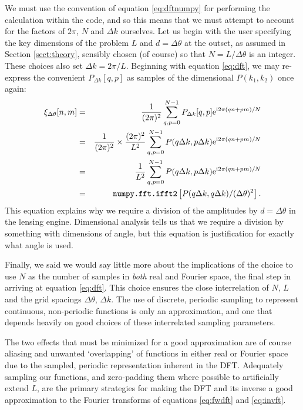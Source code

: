 \documentclass[preprint]{aastex}
\newcommand{\mi}{{\rm i}}
\newcommand{\me}{{\rm e}}
\begin{document}
We must use the convention of equation \eqref{eq:dftnumpy} for
performing the calculation within the code, and so this means that we
must attempt to account for the factors of $2 \pi$, $N$ and $\Delta
k$ ourselves.  Let us begin with the user specifying the
key dimensions of the problem $L$ and $d = \Delta \theta$ at the
outset, as assumed in Section \ref{sect:theory}, sensibly chosen (of
course) so that $N=L/\Delta \theta$ is an integer.  These choices also
set $\Delta k = 2 \pi / L$.  Beginning with equation
\eqref{eq:dft}, we may re-express the convenient $P_{\Delta k}[q, p]$ as
samples of the dimensional $P(k_1, k_2)$ once again:
\begin{eqnarray}
\xi_{\Delta \theta}[n, m] & = & \frac{1}{( 2 \pi)^2}
\sum_{q,p=0}^{N-1} P_{\Delta k} [q, p] \me^{\mi 2 \pi (qn +
  pm) / N}  \\ & = & \frac{1}{(2 \pi)^2} \times \frac{(2 \pi)^2}{L^2}
 \sum_{q,p=0}^{N-1} P(q \Delta k, p \Delta k) \me^{\mi 2 \pi (qn +
  pm) / N} \\
& = & \frac{1}{L^2} \sum_{q,p=0}^{N-1} P(q \Delta k, p \Delta k) \me^{\mi 2 \pi (qn +
  pm) / N} \\
& = & \texttt{numpy.fft.ifft2}\left[P(q \Delta
  k, q \Delta k) / (\Delta \theta)^2\right].
\end{eqnarray}
This equation explains why we require a division of the amplitudes by
$d=\Delta\theta$ in the lensing engine.  Dimensional analysis tells us
that we require a division by something with dimensions of angle, but
this equation is justification for exactly what angle is used.

Finally, we said we would say little more about the implications of
the choice to use $N$ as the
number of samples in \emph{both} real and Fourier space, the final step in
arriving at equation \eqref{eq:dft}.  This choice ensures the
close interrelation of $N$, $L$ and the grid spacings $\Delta \theta$,
$\Delta k$.  The use of discrete, periodic sampling to represent
continuous, non-periodic functions is only an approximation, and
one that depends heavily on good choices of these interrelated sampling
parameters.

The two effects that must be minimized for a good approximation are of course
aliasing and unwanted
`overlapping' of functions in either real or Fourier space due to the
sampled, periodic
representation inherent in the DFT.  Adequately sampling our functions, and zero-padding
them where possible to artificially extend $L$, are the primary
strategies for making the DFT and its inverse a good approximation to
the Fourier transforms of equations \eqref{eq:fwdft} and
\eqref{eq:invft}.
\end{document}
